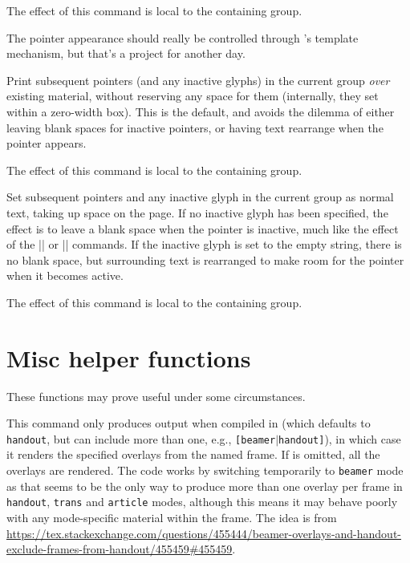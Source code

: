 \documentclass[a4paper]{ltxdoc}
\begin{document}
\begin{gather<>}
\begin{command}{\usepointer{}}
The effect of this command is local to the containing group. 

The pointer appearance should really be controlled through \beamer's template
mechanism, but that's a project for another day.
\end{command}

\begin{command}{\useoverprintpointer}
  Print subsequent pointers (and any inactive glyphs) in the current group
  \emph{over} existing material, without reserving any space for them
  (internally, they set within a zero-width box). This is the default, and
  avoids the dilemma of either leaving blank spaces for inactive pointers, or
  having text rearrange when the pointer appears.

  The effect of this command is local to the containing group. 
\end{command}

\begin{command}{\useuncoverpointer}
  Set subsequent pointers and any inactive glyph in the current group as normal
  text, taking up space on the page.  If no inactive glyph has been specified,
  the effect is to leave a blank space when the pointer is inactive, much like
  the effect of the |\uncover| or |\onslide| commands.  If the inactive glyph is
  set to the empty string, there is no blank space, but surrounding text is
  rearranged to make room for the pointer when it becomes active.

  The effect of this command is local to the containing group. 
\end{command}

\section{Misc helper functions}\label{sec:helper}

These functions may prove useful under some circumstances.

\begin{command}{\handoutframe{}}
  This command only produces output when compiled in  (which
  defaults to \texttt{handout}, but can include more than one, e.g.,
  \texttt{[beamer$\mid$handout]}), in which case it renders the specified
  overlays from the named frame.  If  is omitted,
  all the overlays are rendered.  The code works by switching temporarily to
  \texttt{beamer} mode as that seems to be the only way to produce more than one
  overlay per frame in \texttt{handout}, \texttt{trans} and \texttt{article}
  modes, although this means it may behave poorly with any mode-specific
  material within the frame.  The idea is from
  \url{https://tex.stackexchange.com/questions/455444/beamer-overlays-and-handout-exclude-frames-from-handout/455459#455459}.
\end{command}


\end{gather<>}
\end{document}
